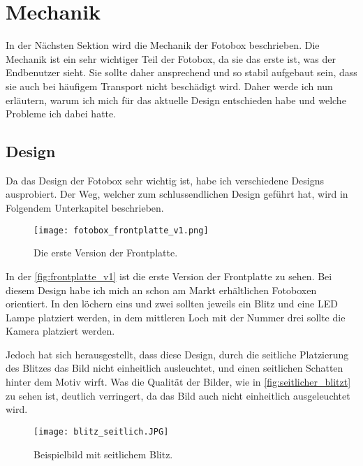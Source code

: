 \graphicspath{{images/mechanics}}

\section{Mechanik}

In der Nächsten Sektion wird die Mechanik der Fotobox beschrieben.
Die Mechanik ist ein sehr wichtiger Teil der Fotobox, da sie das erste
ist, was der Endbenutzer sieht. Sie sollte daher ansprechend und so stabil
aufgebaut sein, dass sie auch bei häufigem Transport nicht beschädigt wird.
Daher werde ich nun erläutern, warum ich mich für das aktuelle Design entschieden habe
und welche Probleme ich dabei hatte.

\subsection{Design}

Da das Design der Fotobox sehr wichtig ist, habe ich verschiedene Designs ausprobiert.
Der Weg, welcher zum schlussendlichen Design geführt hat, wird in Folgendem Unterkapitel beschrieben.

\begin{figure}[H]
    \centering
    \texttt{[image: fotobox\_frontplatte\_v1.png]}
    \caption{Die erste Version der Frontplatte.}
    \label{fig:frontplatte_v1}
\end{figure}

In der \autoref{fig:frontplatte_v1} ist die erste Version der Frontplatte zu sehen.
Bei diesem Design habe ich mich an schon am Markt erhältlichen Fotoboxen orientiert.
In den löchern eins und zwei sollten jeweils ein Blitz und eine LED Lampe platziert werden,
in dem mittleren Loch mit der Nummer drei sollte die Kamera platziert werden.

Jedoch hat sich herausgestellt, dass diese Design, durch die seitliche Platzierung des Blitzes
das Bild nicht einheitlich ausleuchtet, und einen seitlichen Schatten hinter dem 
Motiv wirft. Was die Qualität der Bilder, wie in \autoref{fig:seitlicher_blitzt}
zu sehen ist, deutlich verringert, da das Bild auch nicht einheitlich ausgeleuchtet wird.

\newpage
\begin{figure}[H]
    \centering
    \texttt{[image: blitz\_seitlich.JPG]}
    \caption{Beispielbild mit seitlichem Blitz.}
    \label{fig:seitlicher_blitzt}
\end{figure}

